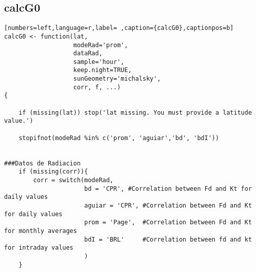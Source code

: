 \subsection{calcG0}
\label{sec:orgf311688}
\begin{lstlisting}[numbers=left,language=r,label= ,caption={calcG0},captionpos=b]
calcG0 <- function(lat,
                   modeRad='prom',
                   dataRad,
                   sample='hour',
                   keep.night=TRUE,
                   sunGeometry='michalsky',
                   corr, f, ...)
{

    if (missing(lat)) stop('lat missing. You must provide a latitude value.')

    stopifnot(modeRad %in% c('prom', 'aguiar','bd', 'bdI'))


###Datos de Radiacion
    if (missing(corr)){
        corr = switch(modeRad,
                      bd = 'CPR', #Correlation between Fd and Kt for daily values
                      aguiar = 'CPR', #Correlation between Fd and Kt for daily values
                      prom = 'Page',  #Correlation between Fd and Kt for monthly averages
                      bdI = 'BRL'     #Correlation between fd and kt for intraday values
                      )
    }


\end{lstlisting}
